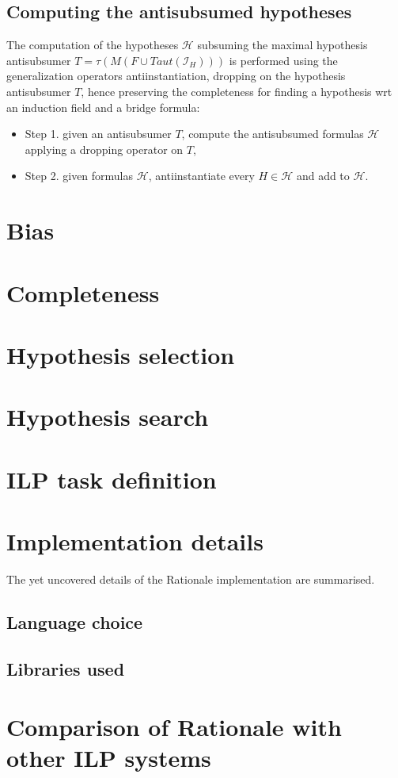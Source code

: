\subsection{Computing the antisubsumed hypotheses}
The computation of the hypotheses $\mathcal{H}$ subsuming the maximal hypothesis  antisubsumer $T=\tau(M(F \cup Taut(\mathcal{I}_H)))$ is performed using the generalization operators\cite{yamamoto2008towards} antiinstantiation, dropping on the hypothesis antisubsumer $T$, hence preserving the completeness for finding a hypothesis wrt an induction field and a bridge formula:

\begin{itemize}
\item Step 1. given an antisubsumer $T$, compute the antisubsumed formulas $\mathcal{H}$ applying a dropping operator on $T$,
\item Step 2. given formulas $\mathcal{H}$, antiinstantiate every $H \in \mathcal{H}$ and add to $\mathcal{H}$.
\end{itemize}

\section{Bias}

\section{Completeness}

\section{Hypothesis selection}

\section{Hypothesis search}

\section{ILP task definition}

\section{Implementation details}
The yet uncovered details of the Rationale implementation are summarised.

\subsection{Language choice}

\subsection{Libraries used}

\section{Comparison of Rationale with other ILP systems}